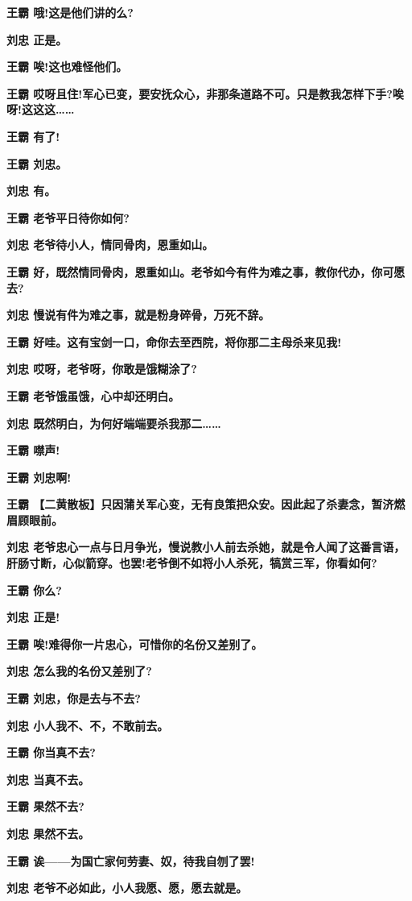 \textbf{王霸 哦!这是他们讲的么?}

\textbf{刘忠 正是。}

\textbf{王霸 唉!这也难怪他们。}

\textbf{王霸
哎呀且住!军心已变，要安抚众心，非那条道路不可。只是教我怎样下手?唉呀!这这这\ldots{}\ldots{}}

\textbf{王霸 有了!}

\textbf{王霸 刘忠。}

\textbf{刘忠 有。}

\textbf{王霸 老爷平日待你如何?}

\textbf{刘忠 老爷待小人，情同骨肉，恩重如山。}

\textbf{王霸
好，既然情同骨肉，恩重如山。老爷如今有件为难之事，教你代办，你可愿去?}

\textbf{刘忠 慢说有件为难之事，就是粉身碎骨，万死不辞。}

\textbf{王霸 好哇。这有宝剑一口，命你去至西院，将你那二主母杀来见我!}

\textbf{刘忠 哎呀，老爷呀，你敢是饿糊涂了?}

\textbf{王霸 老爷饿虽饿，心中却还明白。}

\textbf{刘忠 既然明白，为何好端端要杀我那二\ldots{}\ldots{}}

\textbf{王霸 噤声!}

\textbf{王霸 刘忠啊!}

\textbf{王霸
【二黄散板】只因蒲关军心变，无有良策把众安。因此起了杀妻念，暂济燃眉顾眼前。}

\textbf{刘忠
老爷忠心一点与日月争光，慢说教小人前去杀她，就是令人闻了这番言语，肝肠寸断，心似箭穿。也罢!老爷倒不如将小人杀死，犒赏三军，你看如何?}

\textbf{王霸 你么?}

\textbf{刘忠 正是!}

\textbf{王霸 唉!难得你一片忠心，可惜你的名份又差别了。}

\textbf{刘忠 怎么我的名份又差别了?}

\textbf{王霸 刘忠，你是去与不去?}

\textbf{刘忠 小人我不、不，不敢前去。}

\textbf{王霸 你当真不去?}

\textbf{刘忠 当真不去。}

\textbf{王霸 果然不去?}

\textbf{刘忠 果然不去。}

\textbf{王霸 诶------为国亡家何劳妻、奴，待我自刎了罢!}

\textbf{刘忠 老爷不必如此，小人我愿、愿，愿去就是。}

